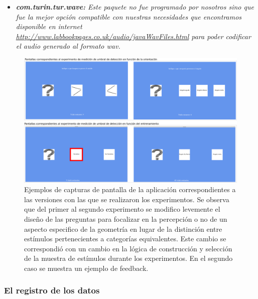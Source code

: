 \documentclass{article}
\begin{document}
\begin{itemize}
        \item \textit{\textbf{com.turin.tur.wave:} Este paquete no fue programado por nosotros sino que fue la mejor opción compatible con nuestras necesidades que encontramos disponible en internet \url{http://www.labbookpages.co.uk/audio/javaWavFiles.html} para poder codificar el audio generado al formato wav.}
        
    \end{itemize}
    
        
    \begin{figure}
        \center
        \includegraphics[width=\textwidth]{Imagenes/Pantallas2.png}
        \caption{Ejemplos de  capturas de pantalla de la aplicación correspondientes a las versiones con las que se realizaron los experimentos. Se observa que del primer al segundo experimento se modifico levemente el diseño de las preguntas para focalizar en la percepción o no de un aspecto especifico de la geometría en lugar de la distinción entre estímulos pertenecientes a categorías equivalentes. Este cambio se correspondió con un cambio en la lógica de construcción y selección de la muestra de estímulos durante los experimentos. En el segundo caso se muestra un ejemplo de feedback.}
        
        \label{fig:Pantallas2}
    \end{figure}
    
    \subsubsection{El registro de los datos}
    
\end{document}
